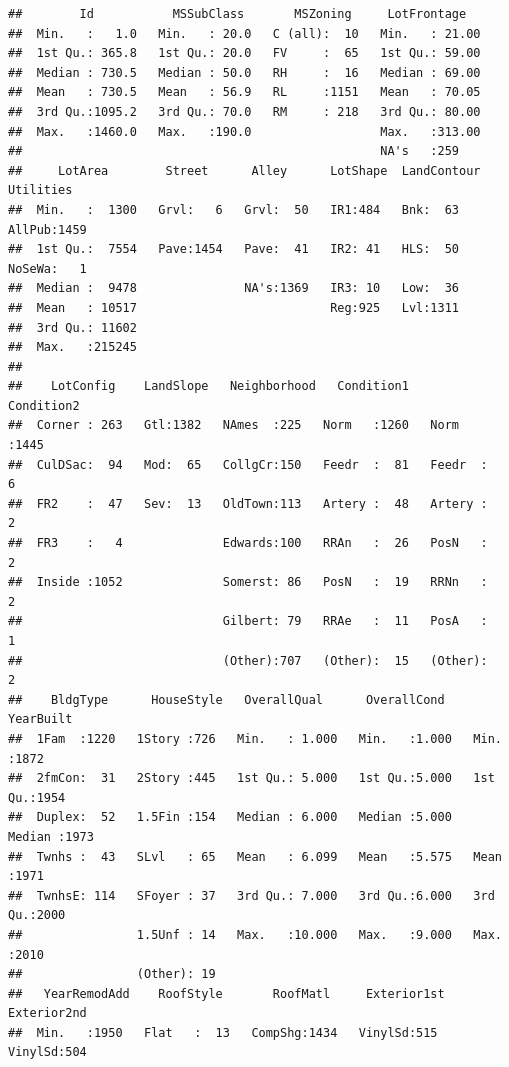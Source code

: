\documentclass[
]{article}
\begin{document}
\begin{verbatim}
##        Id           MSSubClass       MSZoning     LotFrontage    
##  Min.   :   1.0   Min.   : 20.0   C (all):  10   Min.   : 21.00  
##  1st Qu.: 365.8   1st Qu.: 20.0   FV     :  65   1st Qu.: 59.00  
##  Median : 730.5   Median : 50.0   RH     :  16   Median : 69.00  
##  Mean   : 730.5   Mean   : 56.9   RL     :1151   Mean   : 70.05  
##  3rd Qu.:1095.2   3rd Qu.: 70.0   RM     : 218   3rd Qu.: 80.00  
##  Max.   :1460.0   Max.   :190.0                  Max.   :313.00  
##                                                  NA's   :259     
##     LotArea        Street      Alley      LotShape  LandContour  Utilities   
##  Min.   :  1300   Grvl:   6   Grvl:  50   IR1:484   Bnk:  63    AllPub:1459  
##  1st Qu.:  7554   Pave:1454   Pave:  41   IR2: 41   HLS:  50    NoSeWa:   1  
##  Median :  9478               NA's:1369   IR3: 10   Low:  36                 
##  Mean   : 10517                           Reg:925   Lvl:1311                 
##  3rd Qu.: 11602                                                              
##  Max.   :215245                                                              
##                                                                              
##    LotConfig    LandSlope   Neighborhood   Condition1     Condition2  
##  Corner : 263   Gtl:1382   NAmes  :225   Norm   :1260   Norm   :1445  
##  CulDSac:  94   Mod:  65   CollgCr:150   Feedr  :  81   Feedr  :   6  
##  FR2    :  47   Sev:  13   OldTown:113   Artery :  48   Artery :   2  
##  FR3    :   4              Edwards:100   RRAn   :  26   PosN   :   2  
##  Inside :1052              Somerst: 86   PosN   :  19   RRNn   :   2  
##                            Gilbert: 79   RRAe   :  11   PosA   :   1  
##                            (Other):707   (Other):  15   (Other):   2  
##    BldgType      HouseStyle   OverallQual      OverallCond      YearBuilt   
##  1Fam  :1220   1Story :726   Min.   : 1.000   Min.   :1.000   Min.   :1872  
##  2fmCon:  31   2Story :445   1st Qu.: 5.000   1st Qu.:5.000   1st Qu.:1954  
##  Duplex:  52   1.5Fin :154   Median : 6.000   Median :5.000   Median :1973  
##  Twnhs :  43   SLvl   : 65   Mean   : 6.099   Mean   :5.575   Mean   :1971  
##  TwnhsE: 114   SFoyer : 37   3rd Qu.: 7.000   3rd Qu.:6.000   3rd Qu.:2000  
##                1.5Unf : 14   Max.   :10.000   Max.   :9.000   Max.   :2010  
##                (Other): 19                                                  
##   YearRemodAdd    RoofStyle       RoofMatl     Exterior1st   Exterior2nd 
##  Min.   :1950   Flat   :  13   CompShg:1434   VinylSd:515   VinylSd:504  

\end{verbatim}
\end{document}
